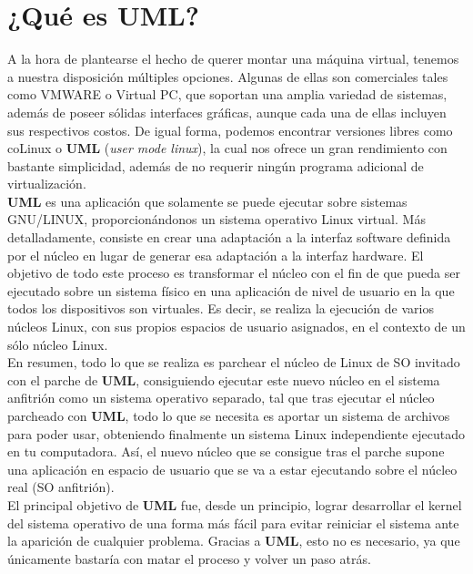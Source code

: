 \documentclass[11pt,twoside,titlepage,a4paper]{article}
\theoremstyle{definition}
\theoremstyle{plain_rojo}
\theoremstyle{remark}
\begin{document}
\section{¿Qué es UML?}

A la hora de plantearse el hecho de querer montar una máquina virtual, 
tenemos a nuestra disposición múltiples opciones. Algunas de ellas son 
comerciales tales como VMWARE o Virtual PC, que soportan  una amplia variedad 
de sistemas, además de poseer sólidas interfaces gráficas, aunque cada una de 
ellas incluyen sus respectivos costos. De igual forma, podemos encontrar 
versiones libres como coLinux o \textbf{UML} (\textit{user mode linux}), 
la cual nos ofrece un gran rendimiento con bastante simplicidad, además de no 
requerir ningún programa adicional de virtualización.
\\

\textbf{UML} es una aplicación que solamente se puede ejecutar sobre sistemas 
GNU/LINUX, proporcionándonos un sistema operativo Linux virtual. Más 
detalladamente, consiste en crear una adaptación a la interfaz software 
definida por el núcleo en lugar de generar esa adaptación a la interfaz 
hardware. El objetivo de todo este proceso es transformar el núcleo con el 
fin de que pueda ser ejecutado sobre un sistema físico en una aplicación de 
nivel de usuario en la que todos los dispositivos son virtuales. Es decir, se 
realiza la ejecución de varios núcleos Linux, con sus propios espacios de 
usuario asignados, en el contexto de un sólo núcleo Linux.
\\

En resumen, todo lo que se realiza es parchear el núcleo de Linux de SO 
invitado con el parche de \textbf{UML}, consiguiendo ejecutar este nuevo 
núcleo en el sistema anfitrión como un sistema operativo separado, tal que 
tras ejecutar el núcleo parcheado con \textbf{UML}, todo lo que se necesita 
es aportar un sistema de archivos para poder usar, obteniendo finalmente un 
sistema Linux independiente ejecutado en tu computadora. Así, el nuevo núcleo 
que se consigue tras el parche supone una aplicación en espacio de usuario 
que se va a estar ejecutando sobre el núcleo real (SO anfitrión).
\\

El principal objetivo de \textbf{UML} fue, desde un principio, lograr 
desarrollar el kernel del sistema operativo de una forma más fácil para 
evitar reiniciar el sistema ante la aparición de cualquier problema. Gracias 
a \textbf{UML}, esto no es necesario, ya que únicamente bastaría con matar el 
proceso y volver un paso atrás.
\\
\end{document}
